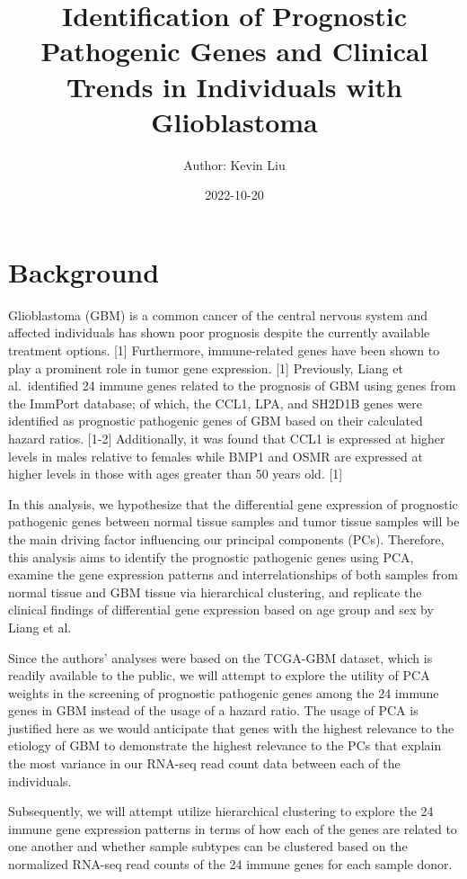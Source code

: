 \documentclass[
]{article}
\title{Identification of Prognostic Pathogenic Genes and Clinical Trends
in Individuals with Glioblastoma}
\author{Author: Kevin Liu}
\date{2022-10-20}
\begin{document}
\maketitle

{
\setcounter{tocdepth}{2}
\tableofcontents
}
\newpage

\hypertarget{background}{%
\section{Background}\label{background}}

Glioblastoma (GBM) is a common cancer of the central nervous system and
affected individuals has shown poor prognosis despite the currently
available treatment options. {[}1{]} Furthermore, immune-related genes
have been shown to play a prominent role in tumor gene expression.
{[}1{]} Previously, Liang et al.~identified 24 immune genes related to
the prognosis of GBM using genes from the ImmPort database; of which,
the CCL1, LPA, and SH2D1B genes were identified as prognostic pathogenic
genes of GBM based on their calculated hazard ratios. {[}1-2{]}
Additionally, it was found that CCL1 is expressed at higher levels in
males relative to females while BMP1 and OSMR are expressed at higher
levels in those with ages greater than 50 years old. {[}1{]}

In this analysis, we hypothesize that the differential gene expression
of prognostic pathogenic genes between normal tissue samples and tumor
tissue samples will be the main driving factor influencing our principal
components (PCs). Therefore, this analysis aims to identify the
prognostic pathogenic genes using PCA, examine the gene expression
patterns and interrelationships of both samples from normal tissue and
GBM tissue via hierarchical clustering, and replicate the clinical
findings of differential gene expression based on age group and sex by
Liang et al.

Since the authors' analyses were based on the TCGA-GBM dataset, which is
readily available to the public, we will attempt to explore the utility
of PCA weights in the screening of prognostic pathogenic genes among the
24 immune genes in GBM instead of the usage of a hazard ratio. The usage
of PCA is justified here as we would anticipate that genes with the
highest relevance to the etiology of GBM to demonstrate the highest
relevance to the PCs that explain the most variance in our RNA-seq read
count data between each of the individuals.

Subsequently, we will attempt utilize hierarchical clustering to explore
the 24 immune gene expression patterns in terms of how each of the genes
are related to one another and whether sample subtypes can be clustered
based on the normalized RNA-seq read counts of the 24 immune genes for
each sample donor.
\end{document}
